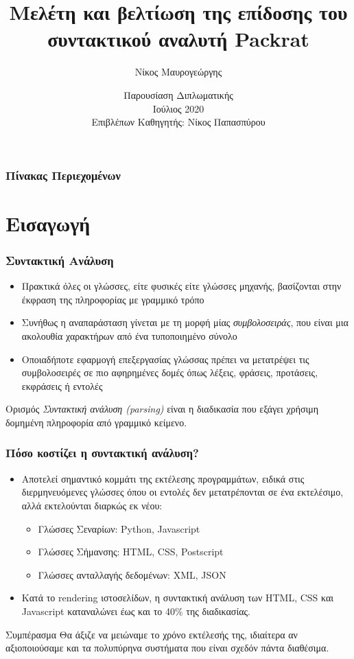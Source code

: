 \documentclass{beamer}
\title[Μελέτη και βελτίωση της επίδοσης του συντακτικού αναλυτή Packrat] %
{Μελέτη και βελτίωση της επίδοσης του συντακτικού αναλυτή Packrat}
\author[Νίκος, Μαυρογεώργης] %
{Νίκος Μαυρογεώργης}
\institute[ECE, NTUA] %
{
  Σχολή Ηλεκτρολόγων Μηχανικών και Μηχανικών Υπολογιστών\\
  Εθνικό Μετσόβειο Πολυτεχνείο
}
\date[NTUA 2020] %
{Παρουσίαση Διπλωματικής \\ Ιούλιος 2020 \\ Επιβλέπων Καθηγητής: Νίκος Παπασπύρου}
\begin{document}
\frame{\titlepage}

\begin{frame}
\frametitle{Πίνακας Περιεχομένων}
\tableofcontents
\end{frame}

\section{Εισαγωγή}

\begin{frame}
  \frametitle{Συντακτική Ανάλυση}
  \begin{itemize}	
	\item Πρακτικά όλες οι γλώσσες, είτε φυσικές είτε γλώσσες μηχανής, βασίζονται στην έκφραση της πληροφορίας με γραμμικό τρόπο
	\item Συνήθως η αναπαράσταση γίνεται με τη μορφή μίας \textit{συμβολοσειράς}, που είναι μια ακολουθία χαρακτήρων από ένα τυποποιημένο σύνολο
	\item Οποιαδήποτε εφαρμογή επεξεργασίας γλώσσας πρέπει να μετατρέψει τις συμβολοσειρές σε πιο αφηρημένες δομές όπως λέξεις, φράσεις, προτάσεις, εκφράσεις ή εντολές \pause
  \end{itemize}

\begin{block}{Ορισμός}
  \textit{Συντακτική ανάλυση (parsing)} είναι η διαδικασία που εξάγει χρήσιμη δομημένη πληροφορία από γραμμικό κείμενο.
\end{block}

\end{frame}

\begin{frame}
  \frametitle{Πόσο κοστίζει η συντακτική ανάλυση?} \pause
  \begin{itemize}
	\item Αποτελεί σημαντικό κομμάτι της εκτέλεσης προγραμμάτων, ειδικά στις διερμηνευόμενες γλώσσες όπου οι εντολές δεν μετατρέπονται σε ένα εκτελέσιμο, αλλά εκτελούνται διαρκώς εκ νέου:
  \begin{itemize}
	\item Γλώσσες Σεναρίων: Python, Javascript
	\item Γλώσσες Σήμανσης: HTML, CSS, Postscript
	\item Γλώσσες ανταλλαγής δεδομένων: XML, JSON \pause
  \end{itemize}
\item Κατά το rendering ιστοσελίδων, η συντακτική ανάλυση των HTML, CSS και Javascript καταναλώνει έως και το 40\% της διαδικασίας. \pause
  \end{itemize}

  \begin{block}{Συμπέρασμα}
	Θα άξιζε να μειώναμε το χρόνο εκτέλεσής της, ιδιαίτερα αν αξιοποιούσαμε και τα πολυπύρηνα συστήματα που είναι σχεδόν πάντα διαθέσιμα.
  \end{block}
\end{frame}
\end{document}
